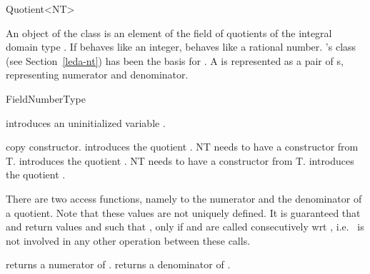 
\begin{ccRefClass} {Quotient<NT>}
\label{Quotient}

\ccDefinition
An object of the class  is an element of the 
field of quotients of the integral domain type .
If  behaves like an integer, 
behaves like a rational number. 
{\leda}'s class  (see Section~\ref{leda-nt})
has been the basis for .
A   is represented as a pair of 
s, representing numerator and denominator.


\ccIsModel
FieldNumberType

\ccCreation
{}

             {introduces an uninitialized variable \ccVar.}

\ccHidden {}
 	    {copy constructor.}
\ccGlue
{}
{introduces the quotient . NT needs to have a constructor from T.}
\ccGlue
{}
{introduces the quotient .
NT needs to have a constructor from T.}
\ccGlue
{}
            {introduces the quotient .}


\ccOperations


There are two access functions, namely to the
numerator and the denominator of a quotient.
Note that these values are not uniquely defined. 
It is guaranteed that  and 
 return values  and
 such that , only
if   and  are called
consecutively wrt , i.e.~ is not involved in 
any other operation between these calls.

       {returns a numerator of .}
\ccGlue
{}
       {returns a denominator of .}


\end{ccRefClass}
